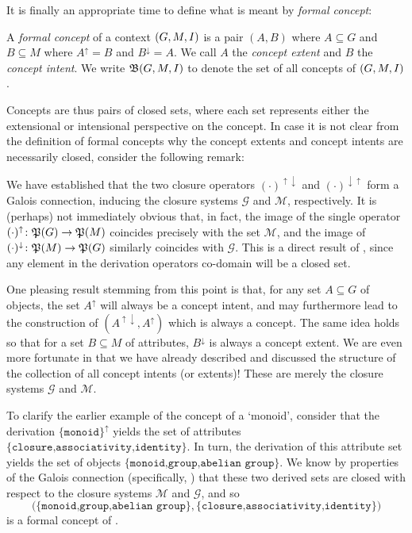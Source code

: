 It is finally an appropriate time to define what is meant by \textit{formal concept}:

\begin{definition}
    \label{definition:formal-concept} A \emph{formal concept} of a context $(G,M,\mathrel{I})$ is a pair $(A,B)$ where $A \subseteq G$ and $B\subseteq M$ where
  $A^{\uparrow}= B$ and $B^{\downarrow}= A$. We call $A$ the \emph{concept extent} and $B$ the \emph{concept intent}. We write ${\mathfrak B} (G,M,\mathrel{I})$ to denote the set of all concepts of $(G,M,\mathrel{I})$.
\end{definition}

Concepts are thus pairs of closed sets, where each set represents either the extensional or intensional perspective on the concept. In case it is not clear from the definition of formal concepts why
the concept extents and concept intents are necessarily closed, consider the following remark:

\begin{remark}
  We have established that the two closure operators $(\cdot)^{\uparrow \downarrow}$ and $(\cdot)^{\downarrow \uparrow}$ form a Galois connection, inducing the closure systems $\mathcal{G}$ and
  $\mathcal{M}$, respectively. It is (perhaps) not immediately obvious that, in fact, the image of the single operator $(\cdot)^{\uparrow}\colon \mathfrak{P}({G})\to \mathfrak{P}({M})$ coincides precisely with the set
  $\mathcal{M}$, and the image of $(\cdot)^{\downarrow}\colon \mathfrak{P}({M})\to \mathfrak{P}({G})$ similarly coincides with $\mathcal{G}$. This is a direct result of , since any element in the
  derivation operators co-domain will be a closed set.
\end{remark}

One pleasing result stemming from this point is that, for any set $A\subseteq G$ of objects, the set $A^{\uparrow}$ will always be a concept intent, and may furthermore lead to the construction of $(A^{\uparrow
\downarrow}, A^{\uparrow})$ which is always a concept. The same idea holds so that for a set $B \subseteq M$ of attributes, $B^{\downarrow}$ is always a concept extent. We are even more fortunate in
that we have already described and discussed the structure of the collection of all concept intents (or extents)! These are merely the closure systems $\mathcal{G}$ and $\mathcal{M}$.

To clarify the earlier example of the concept of a `monoid', consider that the derivation $\{\texttt{monoid}\}^{\uparrow}$ yields the set of attributes $\{\texttt{closure,associativity,identity}\}$. In
turn, the derivation of this attribute set yields the set of objects $\{\texttt{monoid,group,abelian group}\}$. We know by properties of the Galois connection (specifically, )
that these two derived sets are closed with respect to the closure systems $\mathcal{M}$ and $\mathcal{G}$, and so
\[
  \big(\{\texttt{monoid,group,abelian group}\}, \{\texttt{closure,associativity,identity}\}\big)
\]
is a formal concept of .

